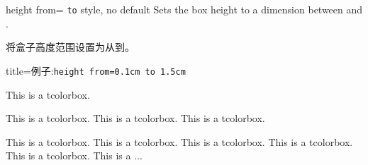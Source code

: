 
\begin{docTcbKey}{height from}{= \texttt{to} }{style, no default}
Sets the box height to a dimension between  and .

将盒子高度范围设置为从到。
\begin{dispExample*}{title={例子:\quad \tt height from=0.1cm to 1.5cm}}

\begin{mybox}
This is a tcolorbox.
\end{mybox}
\begin{mybox}
This is a tcolorbox. This is a tcolorbox. This is a tcolorbox.
\end{mybox}
\begin{mybox}
This is a tcolorbox. This is a tcolorbox. This is a tcolorbox.%
This is a tcolorbox. This is a tcolorbox. This is a ...
\end{mybox}
\end{dispExample*}
\end{docTcbKey}